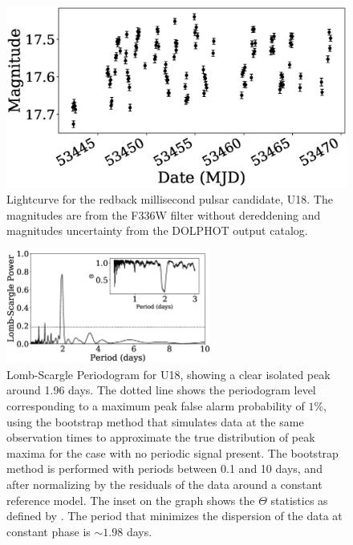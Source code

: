 \documentclass[fleqn,usenatbib,useAMS,letters]{mnras}
\begin{document}

\begin{figure}
	\includegraphics[width=\columnwidth]{lcurvemjd.eps}
    \caption{Lightcurve for the redback millisecond pulsar candidate, U18. The magnitudes are from the F336W filter without dereddening and magnitudes uncertainty from the DOLPHOT output catalog.}
    \label{fig:lc}
\end{figure}


 \begin{figure}
	\includegraphics[width=0.6\textwidth]{LandPDM.eps}
    \caption{Lomb-Scargle Periodogram for %
    U18, showing a clear isolated peak around 1.96 days. The dotted line shows the periodogram level corresponding to a maximum peak false alarm probability of $1\%$, using the bootstrap method that simulates data at the same observation times to approximate the true distribution of peak maxima for the case with no periodic signal present. The bootstrap method is performed with periods between 0.1 and 10 days, and after normalizing by the residuals of the data around a constant reference model. The inset on the graph shows the $\Theta$ statistics as defined by \protect\cite{PDMStellingwerf78}. The period that minimizes the dispersion of the data at constant phase is $\sim 1.98$ days. }
    \label{fig:periodogram}
\end{figure}
\end{document}
